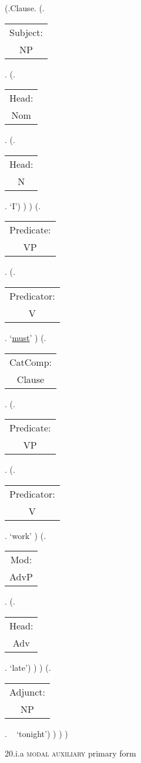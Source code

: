 \documentclass[12pt,letterpaper]{article}
\begin{document}
\begin{figure}
	\begin{center}
		\begin{parsetree}
			(.Clause.
			(.\begin{tabular}{c}Subject:\\NP\end{tabular}.  
			(.\begin{tabular}{c}Head:\\Nom\end{tabular}.
			(.\begin{tabular}{c}Head:\\N\end{tabular}. `I')
			)
			)
			(.\begin{tabular}{c}Predicate:\\VP\end{tabular}.
			(.\begin{tabular}{c}Predicator:\\V\end{tabular}.    `\underline{must}' )
			(.\begin{tabular}{c}CatComp:\\Clause\end{tabular}. 
			(.\begin{tabular}{c}Predicate:\\VP\end{tabular}.
			(.\begin{tabular}{c}Predicator:\\V\end{tabular}.    `work' )
			(.\begin{tabular}{c}Mod:\\AdvP\end{tabular}.  
			(.\begin{tabular}{c}Head:\\Adv\end{tabular}. `late')
			)
			)
			(.\begin{tabular}{c}Adjunct:\\NP\end{tabular}. ~ `tonight')
			)
			)
			)
			
		\end{parsetree}
		\hfill \break \hfill \break
		20.i.a \textsc{modal auxiliary} primary form
	\end{center}
\end{figure}
\end{document}
